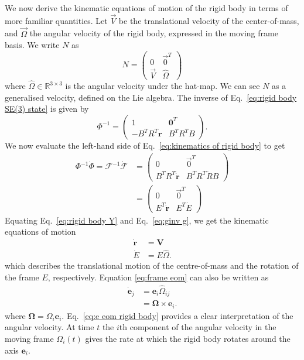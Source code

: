 We now derive the kinematic equations of motion of the rigid body in terms of more familiar quantities. Let $\vec{V}$ be the translational velocity of the center-of-mass, and $\vec{\Omega}$ the angular velocity of the rigid body, expressed in the moving frame basis. We write $N$ as
\begin{equation} \label{eq:rigid body Y}
N = \begin{pmatrix}
0 & \vec{0}^T \\
\vec{V} & \hat{\Omega}
\end{pmatrix}
\end{equation}
where $\hat{\Omega} \in \mathbb{R}^{3 \times 3}$ is the angular velocity under the hat-map. We can see $N$ as a generalised velocity, defined on the Lie algebra. The inverse of Eq.~\ref{eq:rigid body SE(3) state} is given by
\begin{equation}
\Phi^{-1} = \begin{pmatrix}
1 & \mathbf{0}^T \\
-B^T R^T \mathbf{r} & B^T R^T B
\end{pmatrix}.
\end{equation}
We now evaluate the left-hand side of Eq.~\ref{eq:kinematics of rigid body} to get
\begin{equation} \label{eq:ginv g}
\begin{aligned}
\Phi^{-1} \dot{\Phi} = \mathcal{F}^{-1} \dot{\mathcal{F}} & = \begin{pmatrix}
  0 & \vec{0}^T \\
  B^T R^T \dot{\mathbf{r}} & B^T R^T \dot{R} B
\end{pmatrix} \\
& = \begin{pmatrix}
  0 & \vec{0}^T \\
  E^T \dot{\mathbf{r}} &  E^T \dot{E} 
\end{pmatrix}
\end{aligned}
\end{equation}
Equating Eq.~\ref{eq:rigid body Y} and Eq.~\ref{eq:ginv g}, we get the kinematic equations of motion
\begin{subequations}
\begin{align}
\dot{\mathbf{r}} & = \mathbf{V} \\
\dot{E} & = E \hat{\Omega}. \label{eq:frame eom}
\end{align}
\end{subequations}
which describes the translational motion of the centre-of-mass and the rotation of the frame $E$, respectively. Equation \ref{eq:frame eom} can also be written as
\begin{equation} \label{eq:e eom rigid body}
\begin{aligned}
\dot{\mathbf{e}}_j & = \mathbf{e}_i \hat{\Omega}_{ij} \\
& = \boldsymbol{\Omega} \times \mathbf{e}_i.
\end{aligned} 
\end{equation}
where $\boldsymbol{\Omega} = \Omega_i \mathbf{e}_i$. Eq.~\ref{eq:e eom rigid body} provides a clear interpretation of the angular velocity. At time $t$ the $i$th component of the angular velocity  in the moving frame $\Omega_i(t)$ gives the rate at which the rigid body rotates around the axis $\mathbf{e}_i$.

